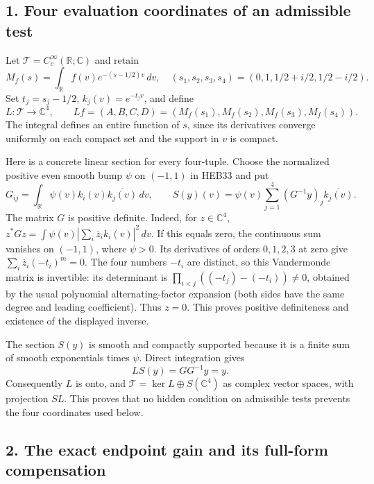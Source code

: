 \documentclass[
  10pt,
  a4paper,
]{article}
\begin{document}
\subsection{1. Four evaluation coordinates of an admissible
test}\label{four-evaluation-coordinates-of-an-admissible-test}

Let \(\mathcal T=C_c^\infty(\mathbb R;\mathbb C)\) and retain \[
M_f(s)=\int_{\mathbb R}f(v)e^{-(s-1/2)v}\,dv,
\quad (s_1,s_2,s_3,s_4)=(0,1,1/2+i/2,1/2-i/2).
\tag{WEC1}
\] Set \(t_j=s_j-1/2\), \(k_j(v)=e^{-t_jv}\), and define \[
L:\mathcal T\longrightarrow\mathbb C^4,
\qquad Lf=(A,B,C,D)=(M_f(s_1),M_f(s_2),M_f(s_3),M_f(s_4)).
\tag{WEC2}
\] The integral defines an entire function of \(s\), since its
derivatives converge uniformly on each compact set and the support in
\(v\) is compact.

Here is a concrete linear section for every four-tuple. Choose the
normalized positive even smooth bump \(\psi\) on \((-1,1)\) in HEB33 and
put \[
G_{ij}=\int_{\mathbb R}\psi(v)k_i(v)\overline{k_j(v)}\,dv,
\qquad
S(y)(v)=\psi(v)\sum_{j=1}^4(G^{-1}y)_j\overline{k_j(v)}.
\tag{WEC3}
\] The matrix \(G\) is positive definite. Indeed, for
\(z\in\mathbb C^4\),
\(z^*Gz=\int\psi(v)|\sum_i\overline z_i k_i(v)|^2\,dv\). If this equals
zero, the continuous sum vanishes on \((-1,1)\), where \(\psi>0\). Its
derivatives of orders \(0,1,2,3\) at zero give
\(\sum_i\overline z_i(-t_i)^m=0\). The four numbers \(-t_i\) are
distinct, so this Vandermonde matrix is invertible: its determinant is
\(\prod_{i<j}((-t_j)-(-t_i))\ne0\), obtained by the usual polynomial
alternating-factor expansion (both sides have the same degree and
leading coefficient). Thus \(z=0\). This proves positive definiteness
and existence of the displayed inverse.

The section \(S(y)\) is smooth and compactly supported because it is a
finite sum of smooth exponentials times \(\psi\). Direct integration
gives \[
L S(y)=GG^{-1}y=y.
\tag{WEC4}
\] Consequently \(L\) is onto, and
\(\mathcal T=\ker L\oplus S(\mathbb C^4)\) as complex vector spaces,
with projection \(SL\). This proves that no hidden condition on
admissible tests prevents the four coordinates used below.

\subsection{2. The exact endpoint gain and its full-form
compensation}\label{the-exact-endpoint-gain-and-its-full-form-compensation}
\end{document}
